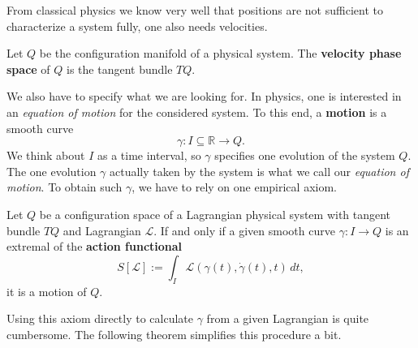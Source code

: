 From classical physics we know very well that positions are not sufficient to characterize a system fully, one also needs velocities.
\begin{definition}
    Let $Q$ be the configuration manifold of a physical system. The \textbf{velocity phase space} of $Q$ is the tangent bundle $TQ$.
\end{definition}
We also have to specify what we are looking for. In physics, one is interested in an \emph{equation of motion} for the considered system. To this end, a \textbf{motion} is a smooth curve
\[
\gamma: I \subseteq \mathbb{R} \to Q
.\] 
We think about $I$ as a time interval, so $\gamma$ specifies one evolution of the system $Q$. The one evolution $\gamma$ actually taken by the system is what we call our \emph{equation of motion}. To obtain such $\gamma$, we have to rely on one empirical axiom.
\begin{axiom}
    Let $Q$ be a configuration space of a Lagrangian physical system with tangent bundle $TQ$ and Lagrangian $\mathcal{L}$. If and only if a given smooth curve $\gamma: I \to Q$ is an extremal of the \textbf{action functional}
    \[
        S[\mathcal{L}] := \int_I \mathcal{L}(\gamma(t), \dot{\gamma}(t),t)\, dt
    ,\] it is a motion of $Q$. 
\end{axiom}
Using this axiom directly to calculate $\gamma$ from a given Lagrangian is quite cumbersome. The following theorem simplifies this procedure a bit.
